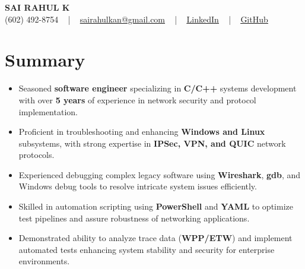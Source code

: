 \documentclass[letterpaper,11pt]{article}
\newcommand{\resumeItem}[1]{
  \item\footnotesize{
    {#1 \vspace{-2pt}}
  }
}
\newcommand{\resumeItemListStart}{\begin{itemize}[leftmargin=*]}
\newcommand{\resumeItemListEnd}{\end{itemize}\vspace{-5pt}}
\begin{document}
\begin{center}
    {\fontsize{14pt}{12pt}\selectfont \textbf{\MakeUppercase{Sai Rahul K}}}\\ \vspace{2pt}
    \fontsize{10pt}{12pt}\selectfont (602) 492-8754 ~ | ~ \href{mailto:sairahulkan@gmail.com}{sairahulkan@gmail.com} ~ | ~
    \href{https://www.linkedin.com/in/rq123/}{\color{blue}\underline{LinkedIn}} ~ | ~
    \href{https://github.com/kanrahuldo}{\color{blue}\underline{GitHub}}~
    \vspace{-8pt}
\end{center}

\section{Summary}
\fontsize{9pt}{10pt}\selectfont
\resumeItemListStart
    \resumeItem{Seasoned \textbf{software engineer} specializing in \textbf{C/C++} systems development with over \textbf{5 years} of experience in network security and protocol implementation.}
    \resumeItem{Proficient in troubleshooting and enhancing \textbf{Windows and Linux} subsystems, with strong expertise in \textbf{IPSec, VPN, and QUIC} network protocols.}
    \resumeItem{Experienced debugging complex legacy software using \textbf{Wireshark}, \textbf{gdb}, and Windows debug tools to resolve intricate system issues efficiently.}
    \resumeItem{Skilled in automation scripting using \textbf{PowerShell} and \textbf{YAML} to optimize test pipelines and assure robustness of networking applications.}
    \resumeItem{Demonstrated ability to analyze trace data (\textbf{WPP/ETW}) and implement automated tests enhancing system stability and security for enterprise environments.}
\resumeItemListEnd
\vspace{-6pt}
\end{document}

